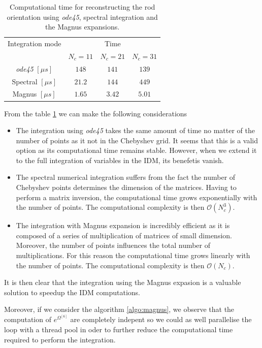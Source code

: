 \documentclass[12pt,a4paper]{article}
\begin{document}
\begin{table}[!ht]
	\begin{tabular}{c|c|c|c}
		Integration mode &	\multicolumn{3}{c}{Time} \\
		&	$N_c = 11$	&	$N_c = 21$	&	$N_c = 31 $	\\
		\hline
		\textit{ode45} $[\mu s]$&	 $148$	& $141$	&	$139$	\\
		Spectral $[\mu s]$&	$21.2$	& $144$	&	$449$ \\
		Magnus $[\mu s]$&	$1.65$	& $3.42$	&	$5.01$ 
	\end{tabular}
	\caption{Computational time for reconstructing the rod orientation using \textit{ode45}, spectral integration and the Magnus expansions.} \label{computational time}
\end{table}
	
	
From the table \ref{computational time} we can make the following considerations
\begin{itemize}
	\item The integration using \textit{ode45} takes the same amount of time no matter of the number of points as it not in the Chebyshev grid. It seems that this is a valid option as its computational time remains stable. However, when we extend it to the full integration of variables in the IDM, its benefetis vanish.
	
	\item The spectral numerical integration suffers from the fact the number of Chebyshev points determines the dimension of the matrices. Having to perform a matrix inversion, the computational time grows exponentially with the number of points. The computational complexity is then $\mathcal{O}(N_c^3)$.
	
	\item The integration with Magnus expansion is incredibly efficient as it is composed of a series of multiplication of matrices of small dimension. Moreover, the number of points influences the total number of multiplications. For this reason the computational time grows linearly with the number of points. The computational complexity is then $\mathcal{O}(N_c)$.
\end{itemize}

It is then clear that the integration using the Magnus expasion is a valuable solution to speedup the IDM computations. 

Moreover, if we consider the algorithm \ref{algo:magnus}, we observe that the computation of $e^{\Omega^{[6]}}$ are completely indepent so we could as well parallelise the loop with a thread pool in oder to further reduce the computational time required to perform the integration.
\end{document}
